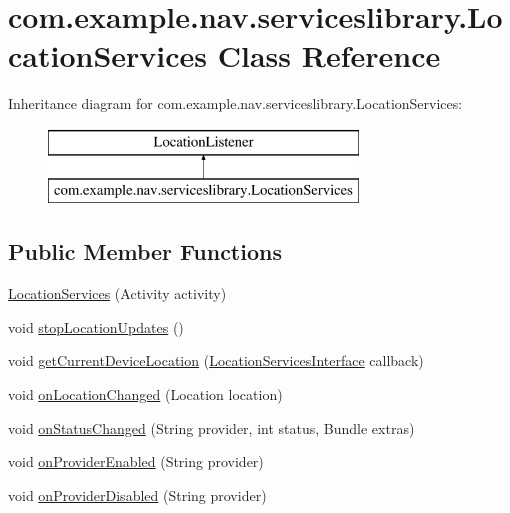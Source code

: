 \hypertarget{classcom_1_1example_1_1nav_1_1serviceslibrary_1_1_location_services}{}\section{com.\+example.\+nav.\+serviceslibrary.\+Location\+Services Class Reference}
\label{classcom_1_1example_1_1nav_1_1serviceslibrary_1_1_location_services}
Inheritance diagram for com.\+example.\+nav.\+serviceslibrary.\+Location\+Services\+:\begin{figure}[H]
\begin{center}
\leavevmode
\includegraphics[height=2.000000cm]{classcom_1_1example_1_1nav_1_1serviceslibrary_1_1_location_services}
\end{center}
\end{figure}
\subsection*{Public Member Functions}
\begin{DoxyCompactItemize}
\item 
\hyperlink{classcom_1_1example_1_1nav_1_1serviceslibrary_1_1_location_services_a9040bda1bcd0673a065f5e49f0c6380a}{Location\+Services} (Activity activity)
\item 
void \hyperlink{classcom_1_1example_1_1nav_1_1serviceslibrary_1_1_location_services_a25a89049a87d1fcac1155370b2c11aa8}{stop\+Location\+Updates} ()
\item 
void \hyperlink{classcom_1_1example_1_1nav_1_1serviceslibrary_1_1_location_services_a2396f10f8f9822fa98dc638829677ab4}{get\+Current\+Device\+Location} (\hyperlink{interfacecom_1_1example_1_1nav_1_1serviceslibrary_1_1_location_services_interface}{Location\+Services\+Interface} callback)
\item 
void \hyperlink{classcom_1_1example_1_1nav_1_1serviceslibrary_1_1_location_services_a127546ec852915cf39c7469bd2da833d}{on\+Location\+Changed} (Location location)
\item 
void \hyperlink{classcom_1_1example_1_1nav_1_1serviceslibrary_1_1_location_services_a2c596d7f4e7362a913da5f46b5c534da}{on\+Status\+Changed} (String provider, int status, Bundle extras)
\item 
void \hyperlink{classcom_1_1example_1_1nav_1_1serviceslibrary_1_1_location_services_ae7a1fec5605cc8f6e91f8ed5b242d8a2}{on\+Provider\+Enabled} (String provider)
\item 
void \hyperlink{classcom_1_1example_1_1nav_1_1serviceslibrary_1_1_location_services_ad3592ed327a5ed57924a320703bf5c0e}{on\+Provider\+Disabled} (String provider)
\end{DoxyCompactItemize}
